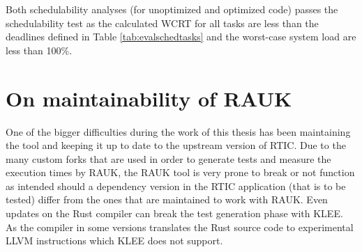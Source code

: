 Both schedulability analyses (for unoptimized and optimized code) passes the
schedulability test as the calculated WCRT for all tasks are less than
the deadlines defined in Table \ref{tab:evalschedtasks} and the worst-case
system load are less than 100\%.

\section{On maintainability of RAUK}
One of the bigger difficulties during the work of this thesis has been
maintaining the tool and keeping it up to date to the upstream version of RTIC.
Due to the many custom forks that are used in order to generate tests and
measure the execution times by RAUK, the RAUK tool is very prone to break or
not function as intended should a dependency version in the RTIC application
(that is to be tested) differ from the ones that are maintained to work with
RAUK. Even updates on the Rust compiler can break the test generation phase
with KLEE. As the compiler in some versions translates the Rust source code to
experimental LLVM instructions which KLEE does not support.

